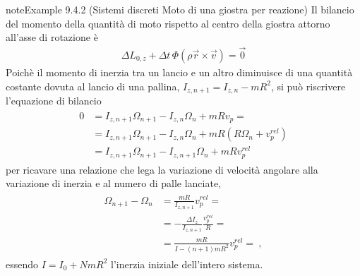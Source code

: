 \documentclass[letterpaper,10pt,italian]{jupyterBook}
\begin{document}
\begin{sphinxadmonition}{note}{Example 9.4.2 (Sistemi discreti \sphinxhyphen{} Moto di una giostra per reazione)}
\sphinxAtStartPar
Il bilancio del momento della quantità di moto rispetto al centro della giostra attorno all’asse di rotazione è
\begin{equation*}
\begin{split}\Delta L_{0,z} + \Delta t \, \Phi(\rho \vec{r} \times \vec{v}) = \vec{0}\end{split}
\end{equation*}
\sphinxAtStartPar
Poichè il momento di inerzia tra un lancio e un altro diminuisce di una quantità costante dovuta al lancio di una pallina,  \(I_{z,n+1} = I_{z,n} - m R^2\), si può riscrivere l’equazione di bilancio
\begin{equation*}
\begin{split}\begin{aligned}
  0 & = I_{z,n+1} \Omega_{n+1} - I_{z,n} \Omega_n + m R v_p =  \\
    & = I_{z,n+1} \Omega_{n+1} - I_{z,n} \Omega_n + m R ( R \Omega_n + v_p^{rel} ) \\
    & = I_{z,n+1} \Omega_{n+1} - I_{z,n+1} \Omega_n + m R v_p^{rel}
\end{aligned}\end{split}
\end{equation*}
\sphinxAtStartPar
per ricavare una relazione che lega la variazione di velocità angolare alla variazione di inerzia e al numero di palle lanciate,
\begin{equation*}
\begin{split}\begin{aligned}
  \Omega_{n+1} - \Omega_n & =  \frac{m R}{I_{z,n+1}} v_p^{rel} = \\
                          & = - \frac{\Delta I_{z}}{I_{z,n+1}} \frac{v_p^{rel}}{R} = \\
                          & =  \frac{m R}{I - (n+1) mR^2} v_p^{rel} = \ ,
\end{aligned}\end{split}
\end{equation*}
\sphinxAtStartPar
essendo \(I = I_0 + N m R^2\) l’inerzia iniziale dell’intero sistema.
\end{sphinxadmonition}
\label{ch/mechanics/dynamics-eom-open:example-2}
\end{document}
